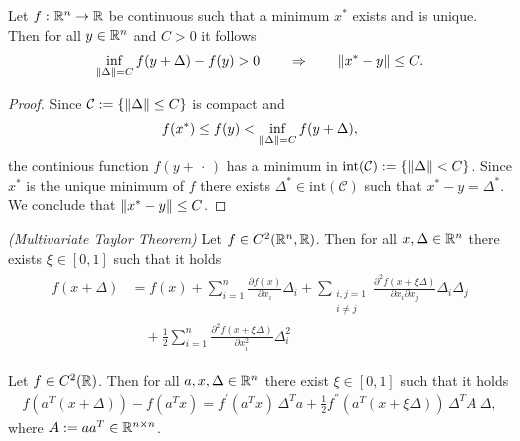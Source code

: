 \begin{proposition}
  Let 
  $f : \mathbb{R}^n \to \mathbb{R}$ 
  be continuous such that 
  a minimum $x^*$ exists and is unique.
  Then 
  for all $y \in \mathbb{R}^n$ and $C>0$ 
  it follows
    \begin{gather}
      \inf_{\left\lVert\Delta\right\rVert=C} f(y+\Delta) - f(y) > 0 \qquad
      \Rightarrow \qquad 
      \left\lVert x^* - y\right\rVert \le C.
    \end{gather}
\end{proposition}


\begin{proof}
Since 
$\mathcal{C}:=\left\{ \left\lVert\Delta\right\rVert\le C \right\}$
is compact and
\begin{gather*}
  f(x^*) \le f(y) <  \inf_{\left\lVert\Delta\right\rVert=C} f(y+\Delta),
\end{gather*}
the continious function $f(y+\,\cdot\,)$ has a minimum in 
$\text{int}(\mathcal{C}):=\left\{ \left\lVert\Delta\right\rVert < C \right\}$. 
Since 
$x^*$ is the unique minimum of $f$
there exists $\Delta^* \in \text{int}(\mathcal{C})$ 
such that 
$x^* - y = \Delta^*$.
We conclude that
$\left\lVert x^* - y\right\rVert \le C$.
\end{proof}



\begin{theorem}
  \emph{(Multivariate Taylor Theorem)}
  Let 
  $f \in C^2(\mathbb{R}^n, \mathbb{R})$.
  Then 
  for all $x, \Delta \in \mathbb{R}^n$
  there exists $\xi \in [0,1]$
  such that 
  it holds
  \begin{align}
    \label{syu_taylor}
    \begin{split}
    f(x + \Delta)
    &=
    f(x)
    +
    \sum_{i = 1}^{n} \frac{\partial f(x)}{\partial x_i} \Delta_i    
    + 
    \sum_{
    \begin{smallmatrix}
      i,j = 1 \\ 
      i \neq j
    \end{smallmatrix}
    }
    \frac{\partial^2 f(x + \xi \Delta)}{\partial x_i \partial x_j} \Delta_i\Delta_j
    \\
    & \quad+ 
    \frac{1}{2}\sum_{i = 1}^{n} \frac{\partial^2 f(x + \xi \Delta)}{\partial x_i^2}\Delta_i^2 
    \end{split}
  \end{align}
\end{theorem}


\begin{corollary}
  Let 
  $f\in C^2(\mathbb{R})$. 
  Then
  for all $a,x,\Delta \in \mathbb{R}^n$ 
  there exist $\xi \in [0,1]$ 
  such that it holds
  \begin{gather}
    \label{syu_2.result}
    f(a^T (x + \Delta)) - f(a^T x) = 
    f^{'}(a^T x)\, \Delta^T a + 
    \frac{1}{2}f^{''}(a^T (x + \xi \Delta))\, \Delta^T A\ \Delta,
  \end{gather}
  where 
  $A:= a a^T \in \mathbb{R}^{n \times n}$.
\end{corollary}

